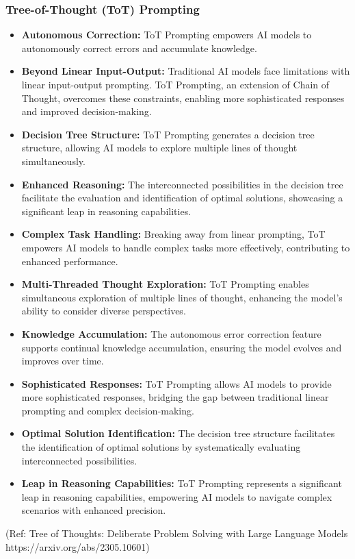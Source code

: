 \begin{frame}[fragile]\frametitle{Tree-of-Thought (ToT) Prompting}

\begin{itemize}
  \item \textbf{Autonomous Correction:} ToT Prompting empowers AI models to autonomously correct errors and accumulate knowledge.
  
  \item \textbf{Beyond Linear Input-Output:} Traditional AI models face limitations with linear input-output prompting. ToT Prompting, an extension of Chain of Thought, overcomes these constraints, enabling more sophisticated responses and improved decision-making.
  
  \item \textbf{Decision Tree Structure:} ToT Prompting generates a decision tree structure, allowing AI models to explore multiple lines of thought simultaneously.
  
  \item \textbf{Enhanced Reasoning:} The interconnected possibilities in the decision tree facilitate the evaluation and identification of optimal solutions, showcasing a significant leap in reasoning capabilities.
  
  \item \textbf{Complex Task Handling:} Breaking away from linear prompting, ToT empowers AI models to handle complex tasks more effectively, contributing to enhanced performance.
  
  \item \textbf{Multi-Threaded Thought Exploration:} ToT Prompting enables simultaneous exploration of multiple lines of thought, enhancing the model's ability to consider diverse perspectives.
  
  \item \textbf{Knowledge Accumulation:} The autonomous error correction feature supports continual knowledge accumulation, ensuring the model evolves and improves over time.
  
  \item \textbf{Sophisticated Responses:} ToT Prompting allows AI models to provide more sophisticated responses, bridging the gap between traditional linear prompting and complex decision-making.
  
  \item \textbf{Optimal Solution Identification:} The decision tree structure facilitates the identification of optimal solutions by systematically evaluating interconnected possibilities.
  
  \item \textbf{Leap in Reasoning Capabilities:} ToT Prompting represents a significant leap in reasoning capabilities, empowering AI models to navigate complex scenarios with enhanced precision.
  
\end{itemize}


{\tiny (Ref: Tree of Thoughts: Deliberate Problem Solving with Large Language Models https://arxiv.org/abs/2305.10601)}



\end{frame}
